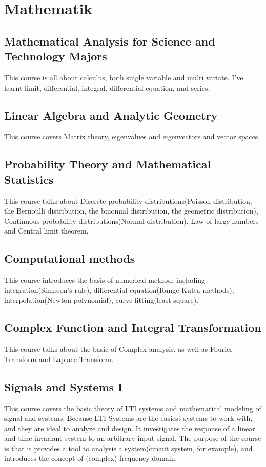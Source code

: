 \section{Mathematik}
\subsection{Mathematical Analysis for Science and Technology Majors}
This course is all about calculus, both single variable and multi variate. I've learnt limit, differential, integral, differential equation, and series.

\subsection{Linear Algebra and Analytic Geometry}
This course covers Matrix theory, eigenvalues and eigenvectors and vector spaces.

\subsection{Probability Theory and Mathematical Statistics}
This course talks about Discrete probability distributions(Poisson distribution, the Bernoulli distribution, the binomial distribution, the geometric distribution), Continuous probability distributions(Normal distribution), Law of large numbers and Central limit theorem.

\subsection{Computational methods}
This course introduces the basis of numerical method, including integration(Simpson's rule), differential equation(Runge Kutta methods), interpolation(Newton polynomial), curve fitting(least square).

\subsection{Complex Function and Integral Transformation}
This course talks about the basic of Complex analysis, as well as Fourier Transform and Laplace Transform.

\subsection{Signals and Systems I}
This course covers the basic theory of LTI systems and mathematical modeling of signal and systems. Because LTI Systems are the easiest systems to work with, and they are ideal to analyze and design. It investigates the response of a linear and time-invariant system to an arbitrary input signal. The purpose of the course is that it provides a tool to analysis a system(circuit system, for example), and introduces the concept of (complex) frequency domain.

